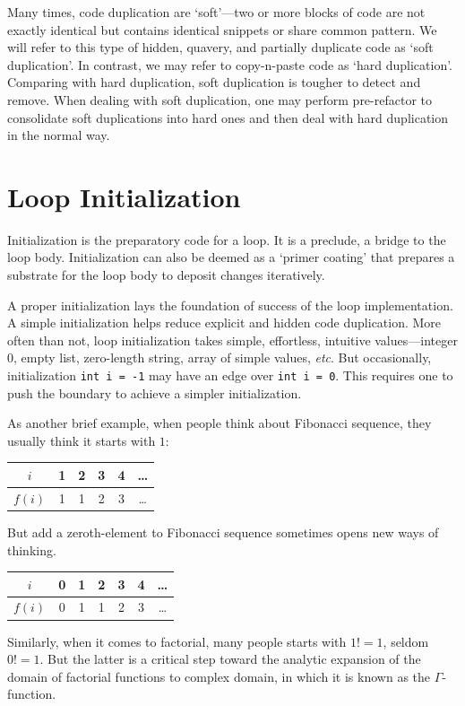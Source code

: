 \documentclass[oneside,11pt]{book}
\theoremstyle{definition}
\theoremstyle{remark}
\newcommand{\code}[1]{\mbox{\lstinline{#1}}}
\begin{document}
Many times, code duplication are `soft'---two or more blocks of code are not exactly
identical but contains identical snippets or share common pattern.
We will refer to this type of hidden, quavery, and partially duplicate code as
`soft duplication'.
In contrast, we may refer to copy-n-paste code as `hard duplication'.
Comparing with hard duplication, soft duplication is tougher to detect and remove.
When dealing with soft duplication, one may perform pre-refactor to
consolidate soft duplications into hard ones and then deal with hard duplication in the normal way.


\section{Loop Initialization}\label{sec:loopInitialization}

Initialization is the preparatory code for a loop.
It is a preclude, a bridge to the loop body.
Initialization can also be deemed as a `primer coating' that prepares a substrate for the loop
body to deposit changes iteratively.


A proper initialization lays the foundation of success of the loop implementation.
A simple initialization helps reduce explicit and hidden code duplication.
More often than not, loop initialization takes simple, effortless,
intuitive values---integer $0$, empty list, zero-length string, array of simple values,
\textit{etc}.
But occasionally, initialization \code{int i = -1} may have an edge over \code{int i = 0}.
This requires one to push the boundary to achieve a simpler initialization.


As another brief example, when people think about Fibonacci sequence, they usually think it starts
with $1$:
\begin{table}[H]
    \centering
    \begin{tabular}{c|c|c|c|c|c}
        \hline
        $i$ & 1 & 2 & 3 & 4 & \ldots \\
        \hline
        $f(i)$ & 1 & 1 & 2 & 3 & \ldots \\
        \hline
    \end{tabular}
\end{table}
But add a zeroth-element to Fibonacci sequence sometimes opens new ways of thinking.
\begin{table}[H]
    \centering
    \begin{tabular}{c|c|c|c|c|c|c}
        \hline
        $i$ & 0 & 1 & 2 & 3 & 4 & \ldots \\
        \hline
        $f(i)$ & 0 & 1 & 1 & 2 & 3 & \ldots \\
        \hline
    \end{tabular}
\end{table}
Similarly, when it comes to factorial, many people starts with $1!=1$, seldom $0!=1$.
But the latter is a critical step toward the analytic expansion of the domain of factorial
functions to complex domain, in which it is known as the $\Gamma$-function.
\end{document}
